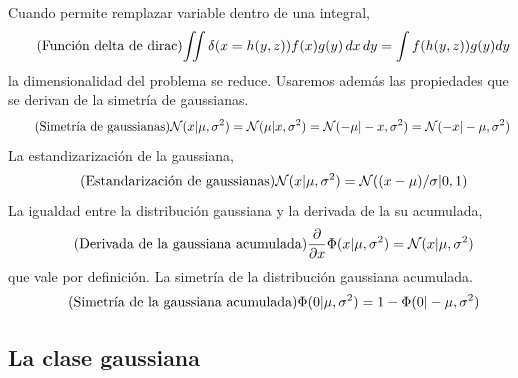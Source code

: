 \documentclass[a4paper,11pt]{book}
\newcommand{\N}{\mathcal{N}}
\theoremstyle{definition}
\begin{document}
%
Cuando permite remplazar variable dentro de una integral,
%
\begin{equation*}\label{eq:integral_con_dirac} \tag{\text{Función delta de dirac}}
\begin{split}
 \iint  \delta(x=h(y,z)) f(x) g(y)\, dx\, dy = \int f(h(y,z)) g(y) dy
 \end{split}
\end{equation*}
%
la dimensionalidad del problema se reduce.
%
Usaremos además las propiedades que se derivan de la simetría de gaussianas.
%
\begin{equation*}\label{eq:simetria} \tag{\text{Simetría de gaussianas}}
 \N(x|\mu,\sigma^2) = \N(\mu|x,\sigma^2) = \N(-\mu|-x,\sigma^2) = \N(-x|-\mu,\sigma^2)
\end{equation*}
%
La estandizarización de la gaussiana,
\begin{equation*}\label{eq:estandarizar} \tag{\text{Estandarización de gaussianas}}
  \N(x|\mu,\sigma^2) = \N((x-\mu)/\sigma | 0, 1)
\end{equation*}
%
La igualdad entre la distribución gaussiana y la derivada de la su acumulada,
\begin{equation*}\label{eq:phi_norm} \tag{\text{Derivada de la gaussiana acumulada}}
 \frac{\partial}{\partial x} \Phi(x|\mu,\sigma^2) = \N(x|\mu,\sigma^2)
\end{equation*}
%
que vale por definición.
%
La simetría de la distribución gaussiana acumulada.
\begin{equation*}\label{eq:phi_simetria} \tag{\text{Simetría de la gaussiana acumulada}}
\Phi(0|\mu,\sigma^2) = 1-\Phi(0|-\mu,\sigma^2)
\end{equation*}

\subsection{La clase gaussiana}\label{sec:Gaussian}
\end{document}

